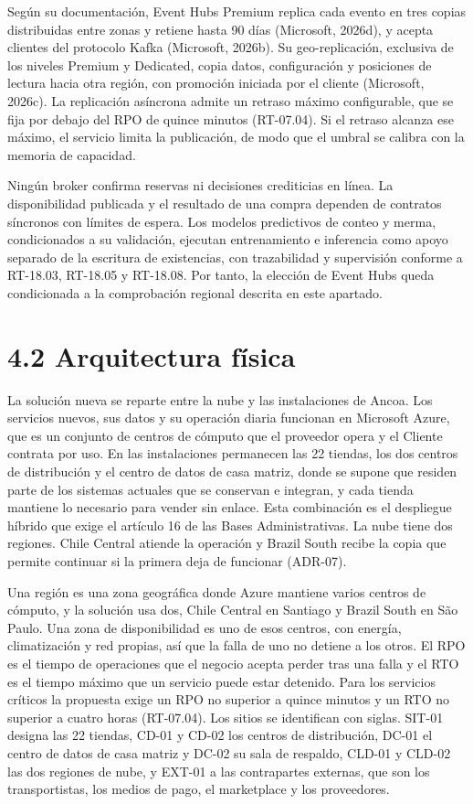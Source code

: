 \documentclass[11pt]{article}
\begin{document}
Según su documentación, Event Hubs Premium replica cada evento en tres copias distribuidas entre zonas y retiene hasta 90 días (Microsoft, 2026d), y acepta clientes del protocolo Kafka (Microsoft, 2026b). Su geo-replicación, exclusiva de los niveles Premium y Dedicated, copia datos, configuración y posiciones de lectura hacia otra región, con promoción iniciada por el cliente (Microsoft, 2026c). La replicación asíncrona admite un retraso máximo configurable, que se fija por debajo del RPO de quince minutos (RT-07.04). Si el retraso alcanza ese máximo, el servicio limita la publicación, de modo que el umbral se calibra con la memoria de capacidad.

Ningún broker confirma reservas ni decisiones crediticias en línea. La disponibilidad publicada y el resultado de una compra dependen de contratos síncronos con límites de espera. Los modelos predictivos de conteo y merma, condicionados a su validación, ejecutan entrenamiento e inferencia como apoyo separado de la escritura de existencias, con trazabilidad y supervisión conforme a RT-18.03, RT-18.05 y RT-18.08. Por tanto, la elección de Event Hubs queda condicionada a la comprobación regional descrita en este apartado.

\section{4.2 Arquitectura física}

La solución nueva se reparte entre la nube y las instalaciones de Ancoa. Los servicios nuevos, sus datos y su operación diaria funcionan en Microsoft Azure, que es un conjunto de centros de cómputo que el proveedor opera y el Cliente contrata por uso. En las instalaciones permanecen las 22 tiendas, los dos centros de distribución y el centro de datos de casa matriz, donde se supone que residen parte de los sistemas actuales que se conservan e integran, y cada tienda mantiene lo necesario para vender sin enlace. Esta combinación es el despliegue híbrido que exige el artículo 16 de las Bases Administrativas. La nube tiene dos regiones. Chile Central atiende la operación y Brazil South recibe la copia que permite continuar si la primera deja de funcionar (ADR-07).

Una región es una zona geográfica donde Azure mantiene varios centros de cómputo, y la solución usa dos, Chile Central en Santiago y Brazil South en São Paulo. Una zona de disponibilidad es uno de esos centros, con energía, climatización y red propias, así que la falla de uno no detiene a los otros. El RPO es el tiempo de operaciones que el negocio acepta perder tras una falla y el RTO es el tiempo máximo que un servicio puede estar detenido. Para los servicios críticos la propuesta exige un RPO no superior a quince minutos y un RTO no superior a cuatro horas (RT-07.04). Los sitios se identifican con siglas. SIT-01 designa las 22 tiendas, CD-01 y CD-02 los centros de distribución, DC-01 el centro de datos de casa matriz y DC-02 su sala de respaldo, CLD-01 y CLD-02 las dos regiones de nube, y EXT-01 a las contrapartes externas, que son los transportistas, los medios de pago, el marketplace y los proveedores.
\end{document}
